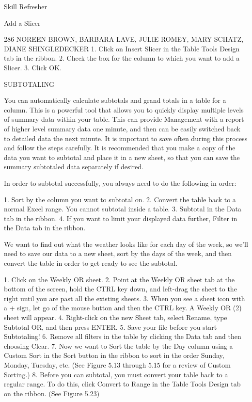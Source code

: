 Skill Refresher


Add a Slicer


286 NOREEN BROWN, BARBARA LAVE, JULIE ROMEY, MARY SCHATZ, DIANE SHINGLEDECKER
1. Click on Insert Slicer in the Table Tools Design tab in the ribbon.
2. Check the box for the column to which you want to add a Slicer.
3. Click OK.



SUBTOTALING

You can automatically calculate subtotals and grand totals in a table for a column. This is a powerful
tool that allows you to quickly display multiple levels of summary data within your table. This can
provide Management with a report of higher level summary data one minute, and then can be easily
switched back to detailed data the next minute. It is important to save often during this process and
follow the steps carefully. It is recommended that you make a copy of the data you want to subtotal
and place it in a new sheet, so that you can save the summary subtotaled data separately if desired.

In order to subtotal successfully, you always need to do the following in order:

1.   Sort by the column you want to subtotal on.
2.   Convert the table back to a normal Excel range. You cannot subtotal inside a table.
3.   Subtotal in the Data tab in the ribbon.
4.   If you want to limit your displayed data further, Filter in the Data tab in the ribbon.

We want to find out what the weather looks like for each day of the week, so we’ll need to save our
data to a new sheet, sort by the days of the week, and then convert the table in order to get ready to
see the subtotal.

1. Click on the Weekly OR sheet.
2. Point at the Weekly OR sheet tab at the bottom of the screen, hold the CTRL key down, and
left-drag the sheet to the right until you are past all the existing sheets.
3. When you see a sheet icon with a + sign, let go of the mouse button and then the CTRL key. A
Weekly OR (2) sheet will appear.
4. Right-click on the new Sheet tab, select Rename, type Subtotal OR, and then press ENTER.
5. Save your file before you start Subtotaling!
6. Remove all filters in the table by clicking the Data tab and then choosing Clear.
7. Now we want to Sort the table by the Day column using a Custom Sort in the Sort button in the
ribbon to sort in the order Sunday, Monday, Tuesday, etc. (See Figure 5.13 through 5.15 for a
review of Custom Sorting.)
8. Before you can subtotal, you must convert your table back to a regular range. To do this, click
Convert to Range in the Table Tools Design tab on the ribbon. (See Figure 5.23)




